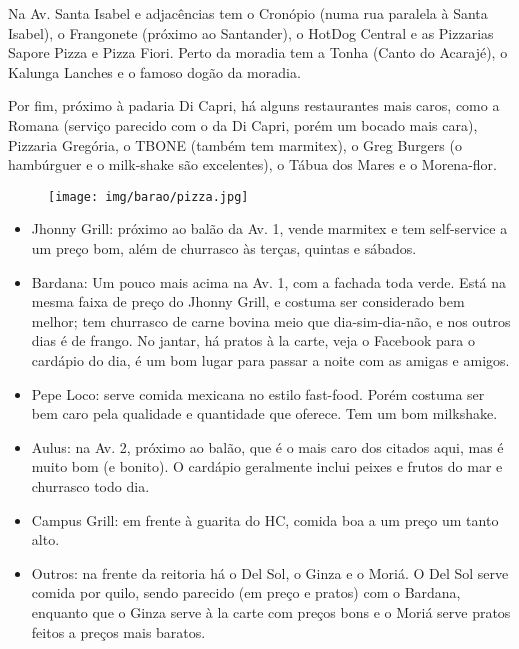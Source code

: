 Na Av. Santa Isabel e adjacências tem o Cronópio (numa rua paralela à Santa
Isabel), o Frangonete (próximo ao Santander), o HotDog Central e as Pizzarias
Sapore Pizza e Pizza Fiori. Perto da moradia tem a Tonha (Canto do Acarajé), o
Kalunga Lanches e o famoso dogão da moradia.

Por fim, próximo à padaria Di Capri, há alguns restaurantes mais caros, como a
Romana (serviço parecido com o da Di Capri, porém um bocado mais cara),
Pizzaria Gregória, o TBONE (também tem marmitex), o Greg Burgers (o hambúrguer
e o milk-shake são excelentes), o Tábua dos Mares e o Morena-flor.

\begin{figure}[h!]
    \centering
    \texttt{[image: img/barao/pizza.jpg]}
\end{figure}



\begin{itemize}
\item Jhonny Grill: próximo ao balão da Av. 1, vende marmitex e tem
  self-service a um preço bom, além de churrasco às terças, quintas e sábados.
\item Bardana: Um pouco mais acima na Av. 1, com a fachada toda verde. Está na
  mesma faixa de preço do Jhonny Grill, e costuma ser considerado bem melhor;
  tem churrasco de carne bovina meio que dia-sim-dia-não, e nos outros dias é
  de frango. No jantar, há pratos à la carte, veja o Facebook para o cardápio
  do dia, é um bom lugar para passar a noite com as amigas e amigos.
\item Pepe Loco: serve comida mexicana no estilo fast-food. Porém costuma ser
  bem caro pela qualidade e quantidade que oferece. Tem um bom milkshake.
\item Aulus: na Av. 2, próximo ao balão, que é o mais caro dos citados aqui,
  mas é muito bom (e bonito). O cardápio geralmente inclui peixes e frutos do
  mar e churrasco todo dia.
\item Campus Grill: em frente à guarita do HC, comida boa a um preço um tanto
  alto.
\item Outros: na frente da reitoria há o Del Sol, o Ginza e o Moriá. O Del
  Sol serve comida por quilo, sendo parecido (em preço e pratos) com o Bardana,
  enquanto que o Ginza serve à la carte com preços bons e o Moriá serve pratos
  feitos a preços mais baratos.
\end{itemize}


